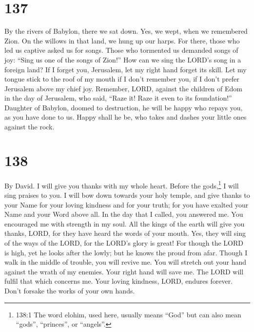 \hypertarget{section-129}{%
\section{137}\label{section-129}}

 By the rivers of Babylon, there we sat down. Yes, we wept,
when we remembered Zion.  On the willows in that land, we
hung up our harps.  For there, those who led us captive
asked us for songs. Those who tormented us demanded songs of joy: ``Sing
us one of the songs of Zion!''  How can we sing the LORD's
song in a foreign land?  If I forget you, Jerusalem, let my
right hand forget its skill.  Let my tongue stick to the
roof of my mouth if I don't remember you, if I don't prefer Jerusalem
above my chief joy.  Remember, LORD, against the children of
Edom in the day of Jerusalem, who said, ``Raze it! Raze it even to its
foundation!''  Daughter of Babylon, doomed to destruction,
he will be happy who repays you, as you have done to us. 
Happy shall he be, who takes and dashes your little ones against the
rock.

\hypertarget{section-130}{%
\section{138}\label{section-130}}

By David.  I will give you thanks with my whole heart.
Before the gods,\footnote{138:1 The word elohim, used here, usually
  means ``God'' but can also mean ``gods'', ``princes'', or ``angels''.}
I will sing praises to you.  I will bow down towards your
holy temple, and give thanks to your Name for your loving kindness and
for your truth; for you have exalted your Name and your Word above all.
 In the day that I called, you answered me. You encouraged
me with strength in my soul.  All the kings of the earth
will give you thanks, LORD, for they have heard the words of your mouth.
 Yes, they will sing of the ways of the LORD, for the LORD's
glory is great!  For though the LORD is high, yet he looks
after the lowly; but he knows the proud from afar.  Though I
walk in the middle of trouble, you will revive me. You will stretch out
your hand against the wrath of my enemies. Your right hand will save me.
 The LORD will fulfil that which concerns me. Your loving
kindness, LORD, endures forever. Don't forsake the works of your own
hands.


